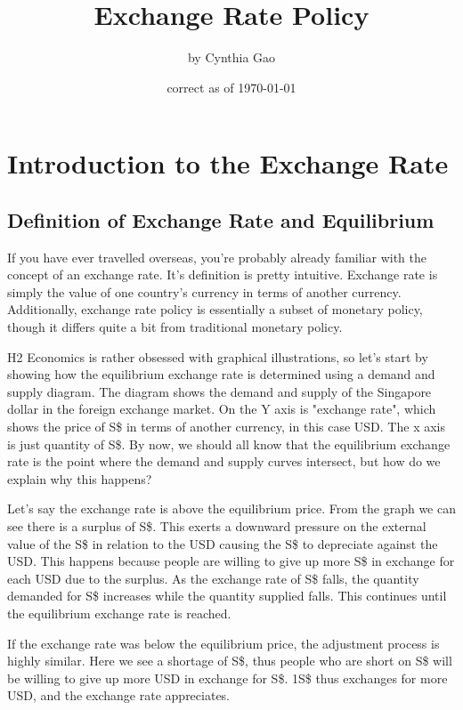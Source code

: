 \RequirePackage{../../dominatrix}

\title{Exchange Rate Policy}
\author{\large by Cynthia Gao}
\date{\small correct as of \today}

\maketitle
\tableofcontents
\section{Introduction to the Exchange Rate}
\subsection{Definition of Exchange Rate and Equilibrium}
If you have ever travelled overseas, you're probably already familiar with the concept of an exchange rate. It's definition is pretty intuitive. Exchange rate is simply the value of one country's currency in terms of another currency. Additionally, exchange rate policy is essentially a subset of monetary policy, though it differs quite a bit from traditional monetary policy.

H2 Economics is rather obsessed with graphical illustrations, so let's start by showing how the equilibrium exchange rate is determined using a demand and supply diagram. The diagram shows the demand and supply of the Singapore dollar in the foreign exchange market. On the Y axis is "exchange rate", which shows the price of S\$ in terms of another currency, in this case USD. The x axis is just quantity of S\$. By now, we should all know that the equilibrium exchange rate is the point where the demand and supply curves intersect, but how do we explain why this happens?

Let's say the exchange rate is above the equilibrium price. From the graph we can see there is a surplus of S\$. This exerts a downward pressure on the external value of the S\$ in relation to the USD causing the S\$ to depreciate against the USD. This happens because people are willing to give up more S\$ in exchange for each USD due to the surplus. As the exchange rate of S\$ falls, the quantity demanded for S\$ increases while the quantity supplied falls. This continues until the equilibrium exchange rate is reached.

If the exchange rate was below the equilibrium price, the adjustment process is highly similar. Here we see a shortage of S\$, thus people who are short on S\$ will be willing to give up more USD in exchange for S\$. 1S\$ thus exchanges for more USD, and the exchange rate appreciates.

